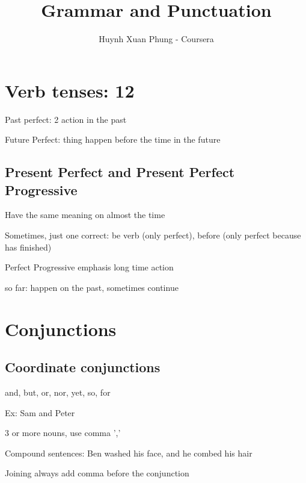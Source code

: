 \documentclass{article}
\title{Grammar and Punctuation}
\author{Huynh Xuan Phung - Coursera}
\date{ }
\begin{document}
 
\maketitle
 
\tableofcontents

\section{Verb tenses: 12}

Past perfect: 2 action in the past 

Future Perfect: thing happen before the time in the future

\subsection{Present Perfect and Present Perfect Progressive}

 Have the same meaning on almost the time
 
 Sometimes, just one correct: be verb (only perfect), before (only perfect because has finished)
 
Perfect  Progressive emphasis long time action

so far: happen on the past, sometimes continue


\section{Conjunctions}

\subsection{Coordinate conjunctions}
and, but, or, nor, yet, so, for

Ex: Sam and Peter

3 or more nouns, use comma ','

Compound sentences: Ben washed his face, and he combed his hair

Joining always add comma before the conjunction


 

 
\end{document}
